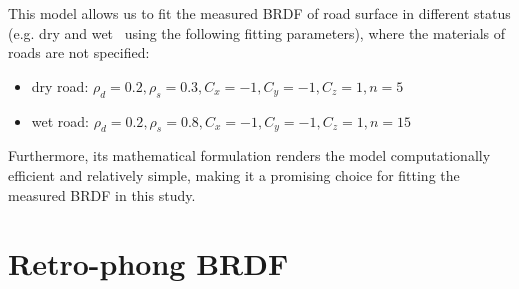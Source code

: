 This model allows us to fit the measured BRDF of road surface in different status (e.g. dry and wet~\cite{2015_Gimonet} using the following fitting parameters), where the materials of roads are not specified:
\begin{itemize}
    \item dry road: $\rho_d = 0.2, \rho_s = 0.3, C_x = -1, C_y = -1, C_z = 1, n = 5$
    \item wet road: $\rho_d = 0.2, \rho_s = 0.8, C_x = -1, C_y = -1, C_z = 1, n = 15$
\end{itemize}
Furthermore, its mathematical formulation renders the model computationally efficient and relatively simple, making it a promising choice for fitting the measured BRDF in this study.


\section{Retro-phong BRDF}
\label{sec:brdf-retro-phong}

